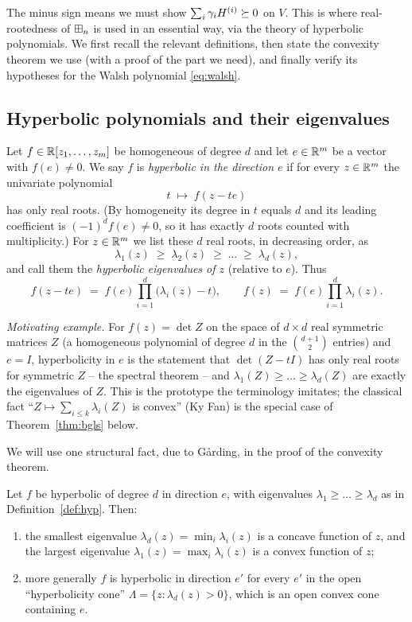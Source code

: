 The minus sign means we must show $\sum_i\gamma_i H^{(i)}\succeq 0$ on $V$. This is
where real-rootedness of $\boxplus_n$ is used in an essential way, via the theory of
hyperbolic polynomials. We first recall the relevant definitions, then state the
convexity theorem we use (with a proof of the part we need), and finally verify
its hypotheses for the Walsh polynomial \eqref{eq:walsh}.

\subsection*{Hyperbolic polynomials and their eigenvalues}

\begin{qfourdefinition}[hyperbolicity]\label{def:hyp}
Let $f\in\mathbb{R}[z_1,\dots,z_m]$ be homogeneous of degree $d$ and let
$e\in\mathbb{R}^m$ be a vector with $f(e)\ne0$. We say $f$ is \emph{hyperbolic in
the direction $e$} if for every $z\in\mathbb{R}^m$ the univariate polynomial
\[
t\;\longmapsto\;f(z-te)
\]
has only real roots. (By homogeneity its degree in $t$ equals $d$ and its
leading coefficient is $(-1)^d f(e)\ne0$, so it has exactly $d$ roots counted
with multiplicity.) For $z\in\mathbb{R}^m$ we list these $d$ real roots, in
decreasing order, as
\[
\lambda_1(z)\;\ge\;\lambda_2(z)\;\ge\;\dots\;\ge\;\lambda_d(z),
\]
and call them the \emph{hyperbolic eigenvalues of $z$} (relative to $e$). Thus
\[
f(z-te)\;=\;f(e)\prod_{i=1}^d\bigl(\lambda_i(z)-t\bigr),\qquad
f(z)\;=\;f(e)\prod_{i=1}^d\lambda_i(z).
\]
\end{qfourdefinition}

\noindent\emph{Motivating example.} For $f(z)=\det Z$ on the space of
$d\times d$ real symmetric matrices $Z$ (a homogeneous polynomial of degree $d$
in the $\binom{d+1}{2}$ entries) and $e=I$, hyperbolicity in $e$ is the
statement that $\det(Z-tI)$ has only real roots for symmetric $Z$ -- the
spectral theorem -- and $\lambda_1(Z)\ge\dots\ge\lambda_d(Z)$ are exactly the
eigenvalues of $Z$. This is the prototype the terminology imitates; the
classical fact ``$Z\mapsto\sum_{i\le k}\lambda_i(Z)$ is convex'' (Ky Fan) is the
special case of Theorem~\ref{thm:bgls} below.

\smallskip
We will use one structural fact, due to G\aa rding, in the proof of the
convexity theorem.

\begin{qfourlemma}\label{lem:garding}
Let $f$ be hyperbolic of degree $d$ in direction $e$, with eigenvalues
$\lambda_1\ge\dots\ge\lambda_d$ as in Definition~\ref{def:hyp}. Then:
\begin{enumerate}\setlength\itemsep{2pt}
\item the smallest eigenvalue
$\lambda_d(z)=\min_i\lambda_i(z)$ is a concave function of $z$, and the largest
eigenvalue $\lambda_1(z)=\max_i\lambda_i(z)$ is a convex function of $z$;
\item more generally $f$ is hyperbolic in direction $e'$ for every $e'$ in the
open ``hyperbolicity cone'' $\Lambda=\{z:\lambda_d(z)>0\}$, which is an open
convex cone containing $e$.
\end{enumerate}
\end{qfourlemma}

